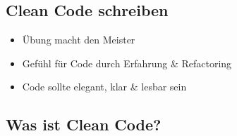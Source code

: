\documentclass[12pt,a4paper,oneside]{article}
\begin{document}
\subsection{Clean Code schreiben}

\begin{itemize}
\item Übung macht den Meister
\item Gefühl für Code durch Erfahrung \& Refactoring
\item Code sollte elegant, klar \& lesbar sein
\end{itemize}

\subsection{Was ist Clean Code?}
\end{document}
